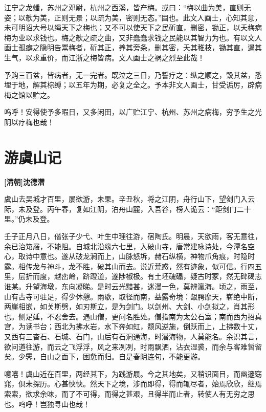 \documentclass[UTF8,titlepage,oneside]{ctexbook}
\begin{document}
江宁之龙蟠，苏州之邓尉，杭州之西溪，皆产梅。或曰：“梅以曲为美，直则无姿；以欹为美，正则无景；以疏为美，密则无态。”固也。此文人画士，心知其意，未可明诏大号以绳天下之梅也；又不可以使天下之民斫直，删密，锄正，以夭梅病梅为业以求钱也。梅之欹之疏之曲，又非蠢蠢求钱之民能以其智力为也。有以文人画士孤癖之隐明告鬻梅者，斫其正，养其旁条，删其密，夭其稚枝，锄其直，遏其生气，以求重价，而江浙之梅皆病。文人画士之祸之烈至此哉！

予购三百盆，皆病者，无一完者。既泣之三日，乃誓疗之：纵之顺之，毁其盆，悉埋于地，解其棕缚；以五年为期，必复之全之。予本非文人画士，甘受诟厉，辟病梅之馆以贮之。

呜呼！安得使予多暇日，又多闲田，以广贮江宁、杭州、苏州之病梅，穷予生之光阴以疗梅也哉！


\chapter*{游虞山记}
\begin{center}
	\textbf{[清朝]沈德潜}
\end{center}

虞山去吴城才百里，屡欲游，未果。辛丑秋，将之江阴，舟行山下，望剑门入云际，未及登。丙午春，复如江阴，泊舟山麓，入吾谷，榜人诡云：“距剑门二十里。”仍未及登。

壬子正月八日，偕张子少弋、叶生中理往游，宿陶氏。明晨，天欲雨，客无意往，余已治筇屐，不能阻。自城北沿缘六七里，入破山寺，唐常建咏诗处，今潭名空心，取诗中意也。遂从破龙涧而上，山脉怒坼，赭石纵横，神物爪角痕，时隐时露。相传龙与神斗，龙不胜，破其山而去。说近荒惑，然有迹象，似可信。行四五里，层折而度，越峦岭，跻蹬道，遂陟椒极。有土坯磈礧，疑古时冢，然无碑碣志谁某。升望海墩，东向凝睇。是时云光黯甚，迷漫一色，莫辨瀛海。顷之，雨至，山有古寺可驻足，得少休憩。雨歇，取径而南，益露奇境：龈腭摩天，崭绝中断，两崖相嵌，如关斯劈，如刃斯立，是为剑门。以剑州、大剑、小剑拟之，肖其形也。侧足延，不忍舍去。遇山僧，更问名胜处。僧指南为太公石室；南而西为招真宫，为读书台；西北为拂水岩，水下奔如虹，颓风逆施，倒跃而上，上拂数十丈，又西有三杳石、石城、石门，山后有石洞通海，时潜海物，人莫能名。余识其言，欲问道往游，而云之飞浮浮，风之来冽冽，时雨飘洒，沾衣湿裘，而余与客难暂留矣。少霁，自山之面下，困惫而归。自是春阴连旬，不能更游。

噫嘻！虞山近在百里，两经其下，为践游屐。今之其地矣，又稍识面目，而幽邃窈窕，俱未探历。心甚怏怏。然天下之境，涉而即得，得而辄尽者，始焉欣欣，继焉索索，欲求余味，而了不可得，而得之甚艰，且得半而止者，转使人有无穷之思也。呜呼！岂独寻山也哉！
\end{document}
